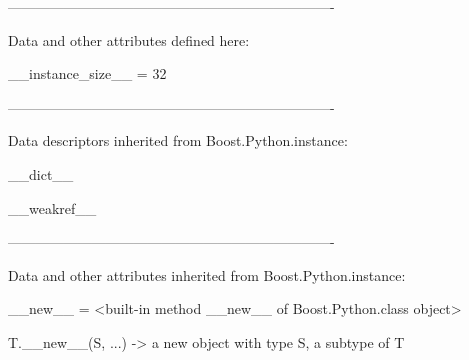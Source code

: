 \documentclass[letterpaper,10pt,english]{sphinxmanual}
\begin{document}
\begin{description}
\begin{description}
\begin{DUlineblock}{0em}
\begin{DUlineblock}{\DUlineblockindent}
\begin{DUlineblock}{\DUlineblockindent}
\item[] 
\end{DUlineblock}
\end{DUlineblock}
\item[] ----------------------------------------------------------------------
\item[] Data and other attributes defined here:
\item[] 
\item[] \_\_instance\_size\_\_ = 32
\item[] 
\item[] ----------------------------------------------------------------------
\item[] Data descriptors inherited from Boost.Python.instance:
\item[] 
\item[] \_\_dict\_\_
\item[] 
\item[] \_\_weakref\_\_
\item[] 
\item[] ----------------------------------------------------------------------
\item[] Data and other attributes inherited from Boost.Python.instance:
\item[] 
\item[] \_\_new\_\_ = \textless{}built-in method \_\_new\_\_ of Boost.Python.class object\textgreater{}
\item[]
\begin{DUlineblock}{\DUlineblockindent}
\item[] T.\_\_new\_\_(S, ...) -\textgreater{} a new object with type S, a subtype of T
\end{DUlineblock}
\end{DUlineblock}


\end{description}
\end{description}
\end{document}
